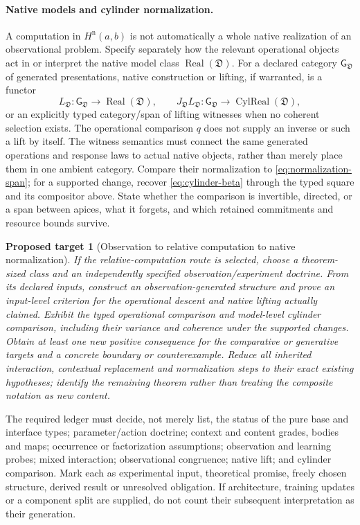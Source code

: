 \documentclass[11pt]{article}
\newtheorem{target}[definition]{Proposed target}
\theoremstyle{remark}
\newcommand{\Real}{\operatorname{Real}}
\begin{document}
\paragraph{Native models and cylinder normalization.}
A computation in $H^{\mathrm n}(a,b)$ is not automatically a whole native realization of an observational problem. Specify separately how the relevant operational objects act in or interpret the native model class $\Real(\mathfrak D)$. For a declared category $\mathsf G_{\mathfrak D}$ of generated presentations, native construction or lifting, if warranted, is a functor
\[
 L_{\mathfrak D}:\mathsf G_{\mathfrak D}\longrightarrow\Real(\mathfrak D),
 \qquad
 J_{\mathfrak D}L_{\mathfrak D}:\mathsf G_{\mathfrak D}
      \longrightarrow\operatorname{CylReal}(\mathfrak D),
\]
or an explicitly typed category/span of lifting witnesses when no coherent selection exists. The operational comparison $q$ does not supply an inverse or such a lift by itself. The witness semantics must connect the same generated operations and response laws to actual native objects, rather than merely place them in one ambient category. Compare their normalization to \eqref{eq:normalization-span}; for a supported change, recover \eqref{eq:cylinder-beta} through the typed square and its compositor above. State whether the comparison is invertible, directed, or a span between apices, what it forgets, and which retained commitments and resource bounds survive.

\begin{target}[Observation to relative computation to native normalization]
\label{target:relative-bridge}
If the relative-computation route is selected, choose a theorem-sized class and an independently specified observation/experiment doctrine. From its declared inputs, construct an observation-generated structure and prove an input-level criterion for the operational descent and native lifting actually claimed. Exhibit the typed operational comparison and model-level cylinder comparison, including their variance and coherence under the supported changes. Obtain at least one new positive consequence for the comparative or generative targets and a concrete boundary or counterexample. Reduce all inherited interaction, contextual replacement and normalization steps to their exact existing hypotheses; identify the remaining theorem rather than treating the composite notation as new content.
\end{target}

The required ledger must decide, not merely list, the status of the pure base and interface types; parameter/action doctrine; context and content grades, bodies and maps; occurrence or factorization assumptions; observation and learning probes; mixed interaction; observational congruence; native lift; and cylinder comparison. Mark each as experimental input, theoretical promise, freely chosen structure, derived result or unresolved obligation. If architecture, training updates or a component split are supplied, do not count their subsequent interpretation as their generation.
\end{document}

